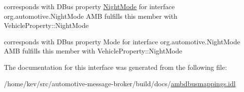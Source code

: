 corresponds with D\+Bus property \hyperlink{interfaceNightMode}{Night\+Mode} for interface org.\+automotive.\+Night\+Mode A\+M\+B fulfills this member with Vehicle\+Property\+::\+Night\+Mode 

corresponds with D\+Bus property Mode for interface org.\+automotive.\+Night\+Mode A\+M\+B fulfills this member with Vehicle\+Property\+::\+Night\+Mode 

The documentation for this interface was generated from the following file\+:\begin{DoxyCompactItemize}
\item 
/home/kev/src/automotive-\/message-\/broker/build/docs/\hyperlink{ambdbusmappings_8idl}{ambdbusmappings.\+idl}\end{DoxyCompactItemize}
